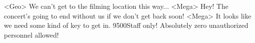 <Geo> We can't get to the filming location this way... 
<Mega> Hey! The concert's going to end without us if we don't get back soon! 
<Mega> It looks like we need some kind of key to get in. 
{95}{00}Staff only! Absolutely zero unauthorized personnel allowed! 
